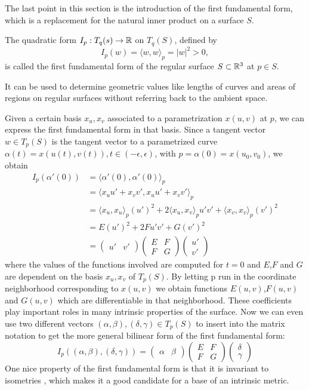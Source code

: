 The last point in this section is the introduction of the first fundamental form, which is a replacement for the natural inner product on a surface $S$.
\begin{mydef}
	The quadratic form $I_p : T_q(s) \rightarrow \mathbb{R}$ on $T_q(S)$, defined by
	$$I_p(w) =  \langle w,w\rangle_p = |w|^2 > 0,$$
	is called the first fundamental form of the regular surface $S\subset\mathbb{R}^3$ at $p\in S$.
\end{mydef}
It can be used to determine geometric values like lengths of curves and areas of regions on regular surfaces without referring back to the ambient space.

Given a certain basis ${x_u, x_v}$ associated to a parametrization $x(u,v)$ at $p$, we can express the first fundamental form in that basis.
Since a tangent vector $w\in T_p(S)$ is the tangent vector to a parametrized curve $\alpha(t) = x(u(t),v(t)), t\in (-\epsilon,\epsilon)$, with $p = \alpha(0) = x(u_0,v_0)$, we obtain
\begin{align*}
	I_p(\alpha'(0)) &= \langle \alpha'(0),\alpha'(0)\rangle_p \\
					&= \langle x_u u' + x_v v',x_u u' + x_v v' \rangle_p \\
					&= \langle x_u ,x_u \rangle_p  (u')^2 + 2\langle x_u ,x_v \rangle_p u' v' + \langle x_v ,x_v \rangle_p (v')^2 \\
					&= E(u')^2 + 2Fu'v'+G(v')^2 \\
					&= \begin{pmatrix} u' & v' \end{pmatrix} \begin{pmatrix} E & F \\ F & G \end{pmatrix} \begin{pmatrix}u' \\ v'\end{pmatrix}
\end{align*}
where the values of the functions involved are computed for $t = 0$ and $E$,$F$ and $G$ are dependent on the basis ${x_u,x_v}$ of $T_p(S)$.
By letting p run in the coordinate neighborhood corresponding to $x(u,v)$ we obtain functions $E(u,v)$,$F(u,v)$ and $G(u,v)$ which are differentiable in that neighborhood.
These coefficients play important roles in many intrinsic properties of the surface.
Now we can even use two different vectors $(\alpha,\beta), (\delta,\gamma) \in T_p(S)$ to insert into the matrix notation to get the more general bilinear form of the first fundamental form:
$$I_p((\alpha, \beta),(\delta, \gamma)) = \begin{pmatrix} \alpha & \beta \end{pmatrix} \begin{pmatrix} E & F \\ F & G \end{pmatrix} \begin{pmatrix}\delta \\ \gamma\end{pmatrix}$$
One nice property of the first fundamental form is that it is invariant to isometries \cite{do1976differential}, which makes it a good candidate for a base of an intrinsic metric.

